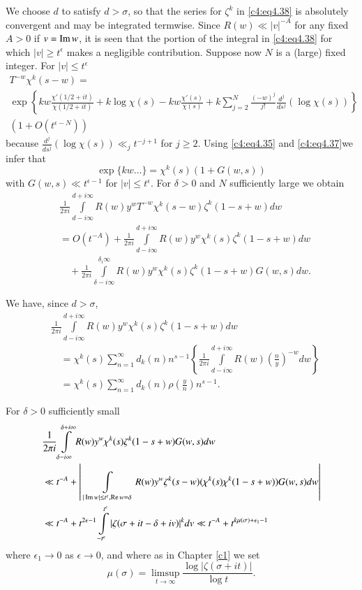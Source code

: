 We choose $d$ to satisfy $d> \sigma$, so that the series for $\zeta^k$
in \eqref{c4:eq4.38} is absolutely convergent and may be integrated
termwise. Since $R(w) \ll |v|^{-A}$ for any fixed $A> 0$ if $v= \operatorname{Im}
w$, it is seen that the portion of the integral in \eqref{c4:eq4.38}
for which $|v|\geq t^\epsilon$ makes a negligible
contribution. Suppose now $N$ is a (large) fixed integer. For $|v|\leq
t^\epsilon$
{\fontsize{10}{12}\selectfont
\begin{multline*}
  T^{-w} \chi^k (s -w)= \\
  \exp \left\{kw \frac{\chi' (1/2 + it)}{\chi (1/2 + it)} + k \log \chi(s)-  kw
  \frac{\chi' (s)}{\chi(s)} + k \sum_{j=2}^N \frac{(-w)^j}{j!}
  \frac{d^j}{ds^j} (\log \chi (s)) \right\}\\ 
  (1+ O (t^{\epsilon -N}))
\end{multline*}}
because $\frac{d^j}{ds^j} (\log \chi (s)) \ll_j t^{- j+1}$ for $j \geq
2$. Using \eqref{c4:eq4.35} and \eqref{c4:eq4.37}\pageoriginale we
infer that 
$$
\exp \{ kw\ldots \} = \chi^k (s) (1+ G(w, s))
$$
with $G(w,s) \ll t^{\epsilon -1}$ for $|v|\leq t^\epsilon$. For
$\delta > 0$ and $N$ sufficiently large we obtain
\begin{align*}
&  \frac{1}{2 \pi i} \int\limits_{d- i \infty}^{d+ i \infty} R(w) y^{w}
  T^{-w} \chi^k (s- w)\zeta^k (1- s+w)dw\\ 
& = O(t^{-A})
 + \frac{1}{2 \pi i} \int\limits_{d- i \infty}^{d+ i \infty} R(w)y^w
  \chi^k (s) \zeta^k (1- s+w)dw\\ 
&\quad  + \frac{1}{2 \pi i}
  \int\limits_{\delta- i \infty}^{\delta _ i \infty} R(w) y^w \chi^k
  (s) \zeta^k (1- s+ w) G(w, s) dw.
\end{align*}

We have, since $d> \sigma$,
\begin{align*}
  &\frac{1}{2 \pi i}  \int\limits_{d- i \infty}^{d+ i \infty} R(w) y^w
  \chi^k (s) \zeta^k (1- s+ w)dw\\
  &\quad = \chi^k (s) \sum_{n=1}^\infty d_k (n) n^{s-1} \left\{\frac{1}{2
    \pi i} \int\limits_{d- i \infty}^{d+ i \infty} R(w)
  \left(\frac{n}{y} \right)^{-w} dw \right\}\\
  &\quad = \chi^k (s) \sum_{n=1}^\infty d_k (n) \rho \left(\frac{y}{n}
  \right) n^{s-1}.
\end{align*}

For $\delta > 0$ sufficiently small
{\fontsize{10pt}{12pt}\selectfont
\begin{align}
  & \frac{1}{2 \pi i} \int\limits_{\delta -i \infty}^{\delta+ i \infty}
  R(w) y^w \chi^k (s) \zeta^k (1- s+ w) G (w, s)dw \label{c4:eq4.39}\\
  & \ll t^{-A} + \left| \int\limits_{\; \; |\operatorname{Im} w |\leq t^\epsilon, \operatorname{Re} w =
    \delta} R(w)y^w \zeta^k (s-w) (\chi^k (s) \chi^k(1- s+w)) G(w,s)
  dw\right|\notag\\
  & \ll t^{-A} + t^{2 \epsilon-1} \int\limits_{-t^\epsilon}^{t^\epsilon}
  |\zeta (\sigma + it - \delta + iv)|^k dv \ll t^{-A} + t^{k \mu
    (\sigma) + \epsilon_1 -1}\notag
\end{align}}
where $\epsilon_1 \to 0$ as $\epsilon \to 0$, and where as in Chapter
\ref{c1} we set 
$$
\mu (\sigma) = \limsup_{t \to \infty} \frac{\log |\zeta (\sigma+
  it)|}{\log t}.
$$

